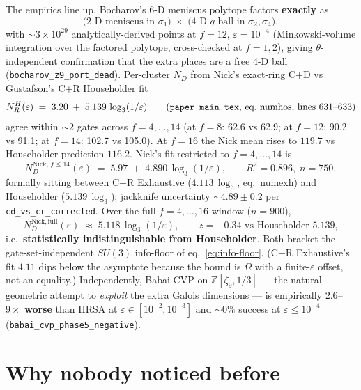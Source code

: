 \documentclass[10pt]{article}
\newcommand{\Z}{\mathbb{Z}}
\newcommand{\zn}{\zeta_9}
\newcommand{\Zzn}{\Z[\zn,1/3]}
\newcommand{\eps}{\varepsilon}
\begin{document}
The empirics line up. Bocharov's 6-D meniscus polytope factors \textbf{exactly} as
\[
\text{(2-D meniscus in $\sigma_1$)}\;\times\;\text{(4-D $q$-ball in $\sigma_2,\sigma_4$)},
\]
with $\sim 3\times 10^{29}$ analytically-derived points at $f{=}12,\,\eps{=}10^{-4}$ (Minkowski-volume integration over the factored polytope, cross-checked at $f{=}1,2$), giving $\theta$-independent confirmation that the extra places are a free 4-D ball (\texttt{bocharov\_z9\_port\_dead}). Per-cluster $N_D$ from Nick's exact-ring C{+}D vs Gustafson's C{+}R Householder fit
\begin{equation}
N^{H}_{R}(\eps) \;=\; 3.20 \;+\; 5.139\,\log_3(1/\eps)
\qquad (\text{\texttt{paper\_main.tex}, eq.~numhos, lines 631--633})
\label{eq:nh-r}
\end{equation}
agree within $\sim 2$ gates across $f{=}4,\dots,14$ (at $f{=}8$: 62.6 vs 62.9; at $f{=}12$: 90.2 vs 91.1; at $f{=}14$: 102.7 vs 105.0). At $f{=}16$ the Nick mean rises to $119.7$ vs Householder prediction $116.2$. Nick's fit restricted to $f{=}4,\dots,14$ is
\begin{equation}
N_{D}^{\text{Nick},\,f\le14}(\eps) \;=\; 5.97 \;+\; 4.890\,\log_3(1/\eps),
\qquad R^2{=}0.896,\; n{=}750,
\label{eq:nick-f14}
\end{equation}
formally sitting between C{+}R Exhaustive ($4.113\,\log_3$, eq.~numexh) and Householder ($5.139\,\log_3$); jackknife uncertainty $\sim 4.89\pm0.2$ per \texttt{cd\_vs\_cr\_corrected}. Over the full $f{=}4,\dots,16$ window ($n{=}900$),
\begin{equation}
N_{D}^{\text{Nick},\,\text{full}}(\eps) \;\approx\; 5.118\,\log_3(1/\eps), \qquad
z = -0.34 \text{ vs Householder } 5.139,
\label{eq:nick-full}
\end{equation}
i.e.\ \textbf{statistically indistinguishable from Householder}. Both bracket the gate-set-independent $SU(3)$ info-floor of eq.~\eqref{eq:info-floor}. (C{+}R Exhaustive's fit $4.11$ dips below the asymptote because the bound is $\Omega$ with a finite-$\eps$ offset, not an equality.) Independently, Babai-CVP on $\Zzn$ --- the natural geometric attempt to \emph{exploit} the extra Galois dimensions --- is empirically $2.6$--$9\times$ \textbf{worse} than HRSA at $\eps\in[10^{-2},10^{-3}]$ and $\sim 0\%$ success at $\eps\le 10^{-4}$ (\texttt{babai\_cvp\_phase5\_negative}).

\section*{Why nobody noticed before}
\end{document}
